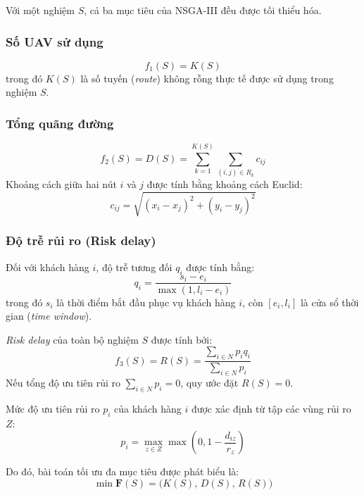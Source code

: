 \documentclass{article}
\begin{document}
Với một nghiệm $S$, cả ba mục tiêu của NSGA-III đều được tối thiểu hóa.

\subsubsection{Số UAV sử dụng}
\begin{equation}
    f_1(S) = K(S)
\end{equation}
trong đó $K(S)$ là số tuyến (\textit{route}) không rỗng thực tế được sử dụng trong nghiệm $S$.

\subsubsection{Tổng quãng đường}
\begin{equation}
    f_2(S) = D(S) = \sum_{k=1}^{K(S)} \sum_{(i,j) \in R_k} c_{ij}
\end{equation}
Khoảng cách giữa hai nút $i$ và $j$ được tính bằng khoảng cách Euclid:
\begin{equation}
    c_{ij} = \sqrt{(x_i - x_j)^2 + (y_i - y_j)^2}
\end{equation}

\subsubsection{Độ trễ rủi ro (Risk delay)}
Đối với khách hàng $i$, độ trễ tương đối $q_i$ được tính bằng:
\begin{equation}
    q_i = \frac{s_i - e_i}{\max(1, l_i - e_i)}
\end{equation}
trong đó $s_i$ là thời điểm bắt đầu phục vụ khách hàng $i$, còn $[e_i, l_i]$ là cửa sổ thời gian (\textit{time window}).

\textit{Risk delay} của toàn bộ nghiệm $S$ được tính bởi:
\begin{equation}
    f_3(S) = R(S) = \frac{\sum_{i \in N} p_i q_i}{\sum_{i \in N} p_i}
\end{equation}
Nếu tổng độ ưu tiên rủi ro $\sum_{i \in N} p_i = 0$, quy ước đặt $R(S) = 0$.

Mức độ ưu tiên rủi ro $p_i$ của khách hàng $i$ được xác định từ tập các vùng rủi ro $Z$:
\begin{equation}
    p_i = \max_{z \in Z} \max \left( 0, 1 - \frac{d_{iz}}{r_z} \right)
\end{equation}

Do đó, bài toán tối ưu đa mục tiêu được phát biểu là:
\begin{equation}
    \min \mathbf{F}(S) = \big( K(S), \, D(S), \, R(S) \big)
\end{equation}
\end{document}
